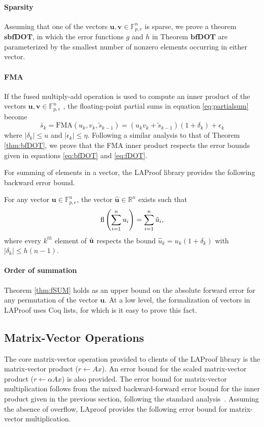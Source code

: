 \paragraph{Sparsity} Assuming that one of the vectors
${\textbf{u}}, {\textbf{v}} \in \mathbb{F}_{p,e}^n$
is sparse, we prove a theorem $\textbf{sbfDOT}$, in which the
error functions $g$ and $h$ in Theorem
$\textbf{bfDOT}$ are parameterized by the smallest number of nonzero elements occurring in either vector.

\paragraph{FMA} If the fused multiply-add
operation is used to compute an inner product of the vectors
${\textbf{u}}, {\textbf{v}} \in \mathbb{F}_{p,e}^n$ , the
floating-point partial sums in equation \ref{eq:partialsum}
become \[\tilde{s_k} = \mathrm{FMA}(u_k, v_k, \tilde {s}_{k-1}) =( u_k
v_k + \tilde{s}_{k-1})(1 + \delta_k) + \epsilon_k\] where $|\delta_k|
\le u$ and $|\epsilon_k| \le \eta$. Following a similar analysis
to that of Theorem \ref{thm:bfDOT}, we prove that the FMA inner
product respects the error bounds given in equations
\ref{eq:bfDOT} and \ref{eq:fDOT}.

For summing of elements in a vector, the LAProof library provides the following
backward error bound.

\begin{theorem} For any vector
${\textbf{u}}\in \mathbb{F}_{p,e}^n$,
the vector $\hat{\textbf{u}} \in \mathbb{R}^n$  exists such 
that\begin{align}\fl\left({\sum_{i=1}^n u_i}\right) = 
{\sum_{i=1}^n \hat{u}_i
},\label{eq:fSUM}
\end{align} 
where every $k^{th}$ element of $\hat{\textbf{u}}$ respects
the bound \newline $ {\hat{u}}_k= u_k(1 + \delta_k)$ with $|\delta_k| \le
h(n-1)$.
\label{thm:fSUM}
\end{theorem}

\paragraph{Order of summation} Theorem \ref{thm:fSUM} 
holds as an upper bound on the absolute forward error for any permutation of the
vector ${\textbf{u}}$. At a low level, the formalization of
vectors in LAProof uses Coq lists, for which is it easy to prove
this fact.

\subsection{Matrix-Vector Operations}\label{sec:matvec}
The core matrix-vector operation provided to clients of  the LAProof library is the matrix-vector product ($r \leftarrow A x$). An  error bound for the scaled matrix-vector product ($ r  \leftarrow \alpha A x $)  is also provided. The error bound for matrix-vector multiplication follows from the mixed backward-forward error bound for the inner product given in the previous section, following the standard analysis~\cite[sec 3.5]{higham_book}. Assuming the absence of overflow, LAproof provides the following error bound for matrix-vector multiplication.  


